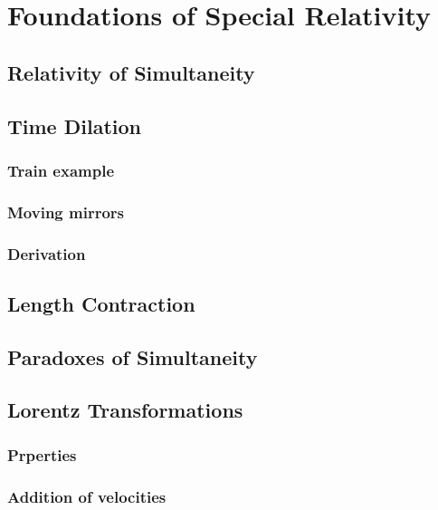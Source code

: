 
\section{Foundations of Special Relativity}

\subsection{Relativity of Simultaneity}

\subsection{Time Dilation}
\subsubsection{Train example}
\subsubsection{Moving mirrors}
\subsubsection{Derivation}

\subsection{Length Contraction}

\subsection{Paradoxes of Simultaneity}

\subsection{Lorentz Transformations}
\subsubsection{Prperties}
\subsubsection{Addition of velocities}